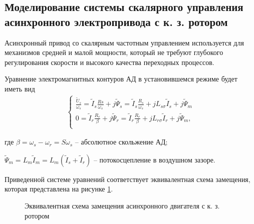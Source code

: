     \subsection{Моделирование системы скалярного управления асинхронного
        электропривода с к. з. ротором}

        Асинхронный привод со скалярным частотным управлением используется для
        механизмов средней и малой мощности, который не требуют глубокого
        регулирования скорости и высокого качества переходных процессов.

        Уравнение электромагнитных контуров АД в установившемся режиме будет
        иметь вид
        \begin{gather*}
            \left\{
            \begin{aligned}
                \frac{\tilde U_s}{\omega_s} =\tilde I_s\frac{Rs}{\omega_s}+
                    j\tilde \Psi_s=\tilde I_s\frac{R_s}{\omega_s}+
                        jL_{s\sigma}\tilde I_s +j\tilde \Psi_m\\
                0 = \tilde I_r\frac{R_r}{\beta}+j\tilde \Psi_r =
                    \tilde I_r\frac{R_r}{\beta}+jL_{r\sigma}\tilde I_r+
                        j \tilde \Psi_m,\\
            \end{aligned}
            \right.
        \end{gather*}

        где $\beta = \omega_s - \omega_r = S\omega_s$ -- абсолютное скольжение АД;\par
        $\tilde \Psi_m = L_m \tilde I_m = L_m(\tilde I_s + \tilde I_r)$ -- потокосцепление
        в воздушном зазоре.

        Приведенной системе уравнений соответствует эквивалентная схема
        замещения, которая представлена на рисунке \ref{fig:ad-zam}.  

        \begin{figure}[h!]
            \caption{Эквивалентная схема замещения асинхронного двигателя с к. з. ротором}
            \label{fig:ad-zam}
        \end{figure}

